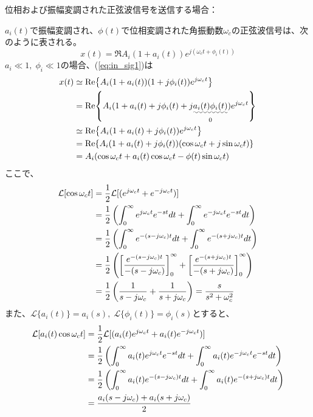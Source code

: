 \documentclass[book]{jlreq}
\begin{document}
位相および振幅変調された正弦波信号を送信する場合：


$a_i(t)$で振幅変調され、$\phi(t)$で位相変調された角振動数$\omega_c$の正弦波信号は、次のように表される。
%
\begin{equation}
    x(t) = \Re{A_i(1+a_i(t))e^{j(\omega_c t+\phi_i(t))}}
    \label{eq:in_sig1}
\end{equation}
%
$a_i \ll 1,\; \phi_i \ll 1$の場合、(\ref{eq:in_sig1})は
%
\begin{align}
    x(t) & \simeq \Re{A_i(1 + a_i(t))(1 + j\phi_i(t))e^{j\omega_c t}}                                \notag   \\
         & = \Re{A_i(1 + a_i(t) + j\phi_i(t) + j\underset{0}{\uwave{a_i(t)\phi_i(t)}})e^{j\omega_c t}} \notag \\
         & \simeq \Re{A_i(1 + a_i(t) + j\phi_i(t))e^{j\omega_c t}}\notag                                      \\
         & = \Re{A_i(1 + a_i(t) + j\phi_i(t))(\cos\omega_c t + j\sin\omega_c t)} \notag                       \\
         & = A_i(\cos\omega_c t + a_i(t)\cos\omega_c t - \phi(t)\sin\omega_c t)
    \label{eq:in_sig2}
\end{align}
%
ここで、
%
\begin{align}
    \mathcal{L} [\cos\omega_c t]
     & = \frac{1}{2}\mathcal{L}[(e^{j\omega_c t}+e^{-j\omega_c t})]\notag                                                    \\
     & = \frac{1}{2}\left(\int_0^\infty e^{j\omega_c t} e^{-st} dt + \int_0^\infty e^{-j\omega_c t} e^{-st} dt \right)\notag \\
     & = \frac{1}{2}\left(\int_0^\infty e^{-(s-j\omega_c) t} dt + \int_0^\infty e^{-(s+j\omega_c) t} dt \right)\notag        \\
     & = \frac{1}{2}\left(\left[\frac{e^{-(s-j\omega_c) t}}{-(s-j\omega_c)}\right]_0^\infty +
    \left[\frac{e^{-(s+j\omega_c) t}}{-(s+j\omega_c)}\right]_0^\infty \right)\notag                                          \\
     & = \frac{1}{2}\left( \frac{1}{s-j\omega_c}+\frac{1}{s+j\omega_c}\right)
    = \frac{s}{s^2+\omega_c^2}
\end{align}
%
また、$\mathcal{L}\{a_i(t)\} = a_i(s),\; \mathcal{L}\{\phi_i(t)\} = \phi_i(s)$とすると、
%
\begin{align}
    \mathcal{L} [a_i(t)\cos\omega_c t]
     & = \frac{1}{2}\mathcal{L}[(a_i(t) e^{j\omega_c t}+a_i(t) e^{-j\omega_c t})]\notag                                                    \\
     & = \frac{1}{2}\left(\int_0^\infty a_i(t) e^{j\omega_c t} e^{-st} dt + \int_0^\infty a_i(t) e^{-j\omega_c t} e^{-st} dt \right)\notag \\
     & = \frac{1}{2}\left(\int_0^\infty a_i(t) e^{-(s-j\omega_c) t} dt + \int_0^\infty a_i(t) e^{-(s+j\omega_c) t} dt \right)\notag        \\
     & = \frac{a_i(s-j\omega_c) + a_i(s+j\omega_c)}{2}
\end{align}
\end{document}
